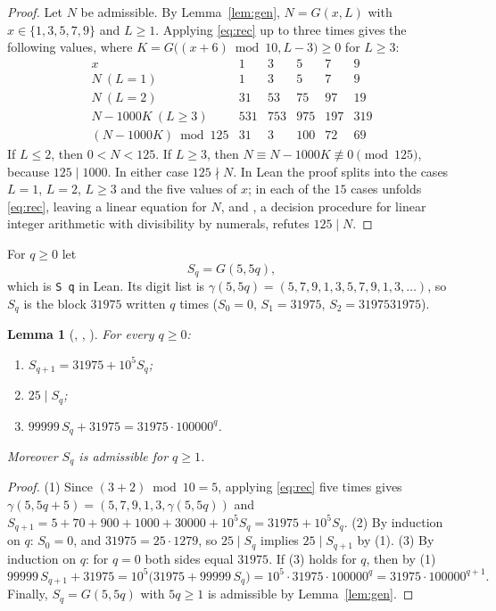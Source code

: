 \documentclass[11pt]{amsart}
\theoremstyle{plain}
\newtheorem{lemma}[theorem]{Lemma}
\theoremstyle{definition}
\begin{document}
\begin{proof}
Let $N$ be admissible. By Lemma~\ref{lem:gen}, $N=G(x,L)$ with $x\in\{1,3,5,7,9\}$ and $L\ge1$. Applying \eqref{eq:rec} up to three times gives the following values, where $K=G\bigl((x+6)\bmod 10,L-3\bigr)\ge0$ for $L\ge3$:
\[
\begin{array}{c|ccccc}
 x & 1 & 3 & 5 & 7 & 9\\\hline
 N\ (L=1) & 1 & 3 & 5 & 7 & 9\\
 N\ (L=2) & 31 & 53 & 75 & 97 & 19\\
 N-1000K\ (L\ge3) & 531 & 753 & 975 & 197 & 319\\
 (N-1000K)\bmod 125 & 31 & 3 & 100 & 72 & 69
\end{array}
\]
If $L\le2$, then $0<N<125$. If $L\ge3$, then $N\equiv N-1000K\not\equiv0\pmod{125}$, because $125\mid1000$. In either case $125\nmid N$.
In Lean the proof splits into the cases $L=1$, $L=2$, $L\ge3$ and the five values of $x$; in each of the $15$ cases  unfolds \eqref{eq:rec}, leaving a linear equation for $N$, and , a decision procedure for linear integer arithmetic with divisibility by numerals, refutes $125\mid N$.
\end{proof}

For $q\ge0$ let
\[
  S_q=G(5,5q),
\]
which is \texttt{S q} in Lean. Its digit list is $\gamma(5,5q)=(5,7,9,1,3,5,7,9,1,3,\dots)$, so $S_q$ is the block $31975$ written $q$ times ($S_0=0$, $S_1=31975$, $S_2=3197531975$).

\begin{lemma}[, , ]\label{lem:S}
For every $q\ge0$:
\begin{enumerate}
\item $S_{q+1}=31975+10^5S_q$;
\item $25\mid S_q$;
\item $99999\,S_q+31975=31975\cdot100000^q$.
\end{enumerate}
Moreover $S_q$ is admissible for $q\ge1$.
\end{lemma}

\begin{proof}
(1) Since $(3+2)\bmod10=5$, applying \eqref{eq:rec} five times gives $\gamma(5,5q+5)=(5,7,9,1,3,\gamma(5,5q))$ and $S_{q+1}=5+70+900+1000+30000+10^5S_q=31975+10^5S_q$.
(2) By induction on $q$: $S_0=0$, and $31975=25\cdot1279$, so $25\mid S_q$ implies $25\mid S_{q+1}$ by (1).
(3) By induction on $q$: for $q=0$ both sides equal $31975$. If (3) holds for $q$, then by (1)
\[
  99999\,S_{q+1}+31975=10^5\bigl(31975+99999\,S_q\bigr)=10^5\cdot31975\cdot100000^q=31975\cdot100000^{q+1}.
\]
Finally, $S_q=G(5,5q)$ with $5q\ge1$ is admissible by Lemma~\ref{lem:gen}.
\end{proof}
\end{document}
